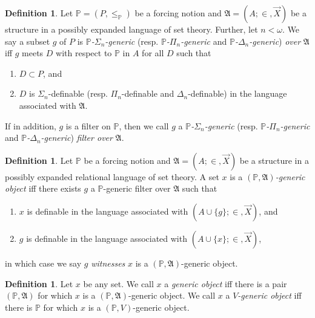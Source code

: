 \documentclass[12pt, twoside]{memoir}
\numberwithin{equation}{section}
\theoremstyle{definition}
\newtheorem{defi}[thm]{Definition}
\theoremstyle{remark}
\theoremstyle{definition}
\theoremstyle{definition}
\theoremstyle{definition}
\theoremstyle{remark}
\begin{document}
\begin{defi}
Let $\mathbb{P} = (P, \leq_{\mathbb{P}})$ be a forcing notion and $\mathfrak{A} = (A; \in, \Vec{X})$ be a structure in a possibly expanded language of set theory. Further, let $n < \omega$. We say a subset $g$ of $P$ is $\mathbb{P}$\emph{-}$\Sigma_n$\emph{-generic} (resp. $\mathbb{P}$\emph{-}$\Pi_n$\emph{-generic} and $\mathbb{P}$\emph{-}$\Delta_n$\emph{-generic}) \emph{over} $\mathfrak{A}$ iff $g$ meets $D$ with respect to $\mathbb{P}$ in $A$ for all $D$ such that
\begin{enumerate}[label=(\alph*)]
    \item $D \subset P$, and
    \item $D$ is $\Sigma_n$-definable (resp. $\Pi_n$-definable and $\Delta_n$-definable) in the language associated with $\mathfrak{A}$.
\end{enumerate}
If in addition, $g$ is a filter on $\mathbb{P}$, then we call $g$ a $\mathbb{P}$\emph{-}$\Sigma_n$\emph{-generic} (resp. $\mathbb{P}$\emph{-}$\Pi_n$\emph{-generic} and $\mathbb{P}$\emph{-}$\Delta_n$\emph{-generic}) \emph{filter over} $\mathfrak{A}$.
\end{defi}

\begin{defi}
Let $\mathbb{P}$ be a forcing notion and $\mathfrak{A} = (A; \in, \Vec{X})$ be a structure in a possibly expanded relational language of set theory. A set $x$ is a $(\mathbb{P}, \mathfrak{A})$\emph{-generic object} iff there exists $g$ a $\mathbb{P}$-generic filter over $\mathfrak{A}$ such that
\begin{enumerate}[label=(\alph*)]
    \item $x$ is definable in the language associated with $(A \cup \{g\}; \in, \Vec{X})$, and
    \item $g$ is definable in the language associated with $(A \cup \{x\}; \in, \Vec{X})$,
\end{enumerate}
in which case we say $g$ \emph{witnesses} $x$ is a $(\mathbb{P}, \mathfrak{A})$-generic object.
\end{defi}

\begin{defi}
Let $x$ be any set. We call $x$ a \emph{generic object} iff there is a pair $(\mathbb{P}, \mathfrak{A})$ for which $x$ is a $(\mathbb{P}, \mathfrak{A})$-generic object. We call $x$ a $V$\emph{-generic object} iff there is $\mathbb{P}$ for which $x$ is a $(\mathbb{P}, V)$-generic object.
\end{defi}
\end{document}
